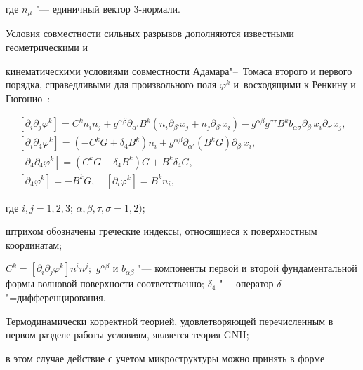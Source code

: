 где $n_\mu$ "--- единичный вектор $3$-нормали.



Условия совместности сильных разрывов дополняются известными~\cite{MurashkinRadayev:bib:Thomas} геометрическими и

кинематическими условиями совместности Адамара"--~Томаса второго и первого порядка, справедливыми для произвольного поля $\varphi^k$ и~восходящими к Ренкину и Гюгонио~\cite{MurashkinRadayev:bib:Rankine, MurashkinRadayev:bib:Hugoniot}:

\begin{gather*}

[\partial_i \partial_j{\varphi^k}]=C^kn_in_j+g^{\alpha\beta}\partial_{\alpha'} B^k(n_i \partial_{\beta'} x_{j}+n_j \partial_{\beta'} x_{i})-g^{\alpha\beta}g^{\sigma\tau}B^kb_{\alpha\sigma} \partial_{\beta'} x_{i} \partial_{\tau'} x_{j},\\

[\partial_i  \partial_4 {\varphi^k}]=(-C^kG+\delta_4 B^k )n_i + g^{\alpha\beta}  \partial_{\alpha'} (B^kG) \partial_{\beta'} x_{i},\\

[\partial_4 \partial_4 {\varphi^k}]=(C^kG-\delta_4 B^k )G +B^k\delta_4 G,\\

[\partial_4 {\varphi^k}]=-B^kG,\quad [\partial_i {\varphi^k}]=B^kn_i,

\end{gather*}

где $i, j=1, 2, 3$; $\alpha, \beta, \tau, \sigma=1, 2)$; 

штрихом обозначены греческие индексы, относящиеся к  поверхностным координатам; 

$C^k=[ \partial_i \partial_j{\varphi^k}]n^in^j;$  $g^{\alpha\beta}$ и $b_{\alpha\beta}$ "--- компоненты первой и второй фундаментальной формы волновой поверхности соответственно; $\delta_4$ "--- оператор $\delta$"=дифференцирования.



\smallskip




Термодинамически корректной теорией, удовлетворяющей перечисленным в первом разделе работы условиям,  является теория GNII;

в этом случае действие с учетом микроструктуры можно принять в форме \cite{MurashkinRadayev:bib:WPinFTandTM}

